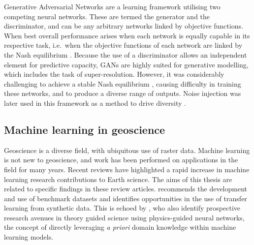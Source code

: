 Generative Adversarial Networks \parencite{goodfellowGenerativeAdversarialNets2014} are a learning framework utilising two competing neural networks.
These are termed the generator and the discriminator, and can be any arbitrary networks linked by objective functions.
When best overall performance arises when each network is equally capable in its respective task, i.e.\ when the objective functions of each network are linked by the Nash equilibrium \parencite{salimansImprovedTechniquesTraining2016,lucicAreGANsCreated2018}.
Because the use of a discriminator allows an independent element for predictive capacity, GANs are highly suited for generative modelling, which includes the task of super-resolution.
However, it was considerably challenging to achieve a stable Nash equilibrium \parencite{salimansImprovedTechniquesTraining2016}, causing difficulty in training these networks, and to produce a diverse range of outputs.
Noise injection was later used in this framework as a method to drive diversity \parencite{karrasStylebasedGeneratorArchitecture2018,rakotonirinaESRGANFurtherImproving2020}.



\subsection{Machine learning in geoscience}
\label{sec:introgeoml}

Geoscience is a diverse field, with ubiquitous use of raster data.
Machine learning is not new to geoscience, and work has been performed on applications in the field for many years.
Recent reviews have highlighted a rapid increase in machine learning research contributions to Earth science.
The aims of this thesis are related to specific findings in these review articles.
\textcite{bergenMachineLearningDatadriven2019} recommends the development and use of benchmark datasets and identifies opportunities in the use of transfer learning from synthetic data.
This is echoed by \textcite{karpatneMachineLearningGeosciences2019}, who also identify prospective research avenues in theory guided science using physics-guided neural networks, the concept of directly leveraging \emph{a priori} domain knowledge within machine learning models.

